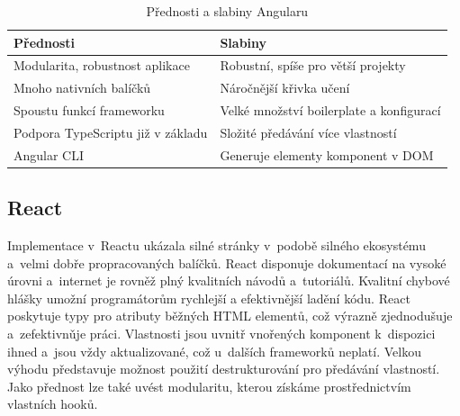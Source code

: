 \begin{table}[htb]
	\centering
	\caption{Přednosti a slabiny Angularu}
	\medskip
	\radkovani[1.2]
		\begin{tabular}{|l|l|}
		\hline
		\textbf{Přednosti}									& \textbf{Slabiny}                    			\\ \hline
		Modularita, robustnost aplikace			& Robustní, spíše pro větší projekty				\\ \hline
		Mnoho nativních balíčků							& Náročnější křivka učení										\\ \hline
		Spoustu funkcí frameworku						& Velké množství boilerplate a konfigurací	\\ \hline
		Podpora TypeScriptu již v základu		& Složité předávání více vlastností					\\ \hline
		Angular CLI													& Generuje elementy komponent v DOM					\\ \hline
		\end{tabular}
	\label{tab:angulartabulka}
\end{table}


\subsection*{React}

Implementace v~Reactu ukázala silné stránky v~podobě silného ekosystému a~velmi dobře propracovaných balíčků. 
React disponuje dokumentací na vysoké úrovni a~internet je rovněž plný kvalitních návodů a~tutoriálů. 
Kvalitní chybové hlášky umožní programátorům rychlejší a efektivnější ladění kódu. 
React poskytuje typy pro atributy běžných HTML elementů, což výrazně zjednodušuje a~zefektivnǔje práci. 
Vlastnosti jsou uvnitř vnořených komponent k~dispozici ihned a~jsou vždy aktualizované, což u~dalších frameworků neplatí. 
Velkou výhodu představuje možnost použití destrukturování pro předávání vlastností. 
Jako přednost lze také uvést modularitu, kterou získáme prostřednictvím vlastních hooků. 

